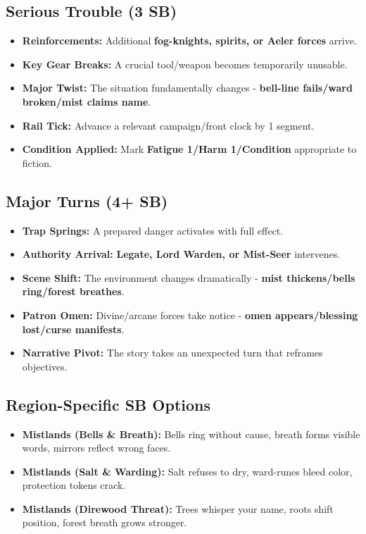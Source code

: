 \subsection*{Serious Trouble (3 SB)}
\begin{itemize}
\item \textbf{Reinforcements:} Additional \textbf{fog-knights, spirits, or Aeler forces} arrive.
\item \textbf{Key Gear Breaks:} A crucial tool/weapon becomes temporarily unusable.
\item \textbf{Major Twist:} The situation fundamentally changes - \textbf{bell-line fails/ward broken/mist claims name}.
\item \textbf{Rail Tick:} Advance a relevant campaign/front clock by 1 segment.
\item \textbf{Condition Applied:} Mark \textbf{Fatigue 1/Harm 1/Condition} appropriate to fiction.
\end{itemize}

\subsection*{Major Turns (4+ SB)}
\begin{itemize}
\item \textbf{Trap Springs:} A prepared danger activates with full effect.
\item \textbf{Authority Arrival:} \textbf{Legate, Lord Warden, or Mist-Seer} intervenes.
\item \textbf{Scene Shift:} The environment changes dramatically - \textbf{mist thickens/bells ring/forest breathes}.
\item \textbf{Patron Omen:} Divine/arcane forces take notice - \textbf{omen appears/blessing lost/curse manifests}.
\item \textbf{Narrative Pivot:} The story takes an unexpected turn that reframes objectives.
\end{itemize}

\subsection*{Region-Specific SB Options}
\begin{itemize}
\item \textbf{Mistlands (Bells \& Breath):} Bells ring without cause, breath forms visible words, mirrors reflect wrong faces.
\item \textbf{Mistlands (Salt \& Warding):} Salt refuses to dry, ward-runes bleed color, protection tokens crack.
\item \textbf{Mistlands (Direwood Threat):} Trees whisper your name, roots shift position, forest breath grows stronger.
\end{itemize}



